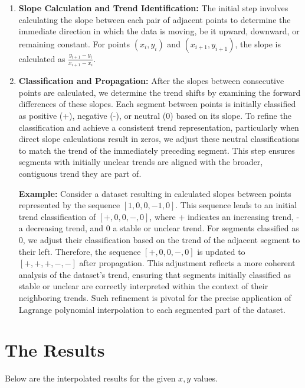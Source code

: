 \documentclass{article}
\begin{document}
\begin{enumerate}
    \item \textbf{Slope Calculation and Trend Identification:} 
    The initial step involves calculating the slope between each pair of adjacent points to determine the immediate direction in which the data is moving, be it upward, downward, or remaining constant. For points $(x_i, y_i)$ and $(x_{i+1}, y_{i+1})$, the slope is calculated as $\frac{y_{i+1} - y_i}{x_{i+1} - x_i}$. 

	\item \textbf{Classification and Propagation:} 
After the slopes between consecutive points are calculated, we determine the trend shifts by examining the forward differences of these slopes. Each segment between points is initially classified as positive (+), negative (-), or neutral (0) based on its slope. To refine the classification and achieve a consistent trend representation, particularly when direct slope calculations result in zeros, we adjust these neutral classifications to match the trend of the immediately preceding segment. This step ensures segments with initially unclear trends are aligned with the broader, contiguous trend they are part of.

	\textbf{Example:}
Consider a dataset resulting in calculated slopes between points represented by the sequence $[1, 0, 0, -1, 0]$. This sequence leads to an initial trend classification of $[+, 0, 0, -, 0]$, where + indicates an increasing trend, - a decreasing trend, and 0 a stable or unclear trend. For segments classified as 0, we adjust their classification based on the trend of the adjacent segment to their left. Therefore, the sequence $[+, 0, 0, -, 0]$ is updated to $[+, +, +, -, -]$ after propagation. This adjustment reflects a more coherent analysis of the dataset's trend, ensuring that segments initially classified as stable or unclear are correctly interpreted within the context of their neighboring trends. Such refinement is pivotal for the precise application of Lagrange polynomial interpolation to each segmented part of the dataset.



\end{enumerate}


\section{The Results}
Below are the interpolated results for the given \(x, y\) values.
\end{document}
